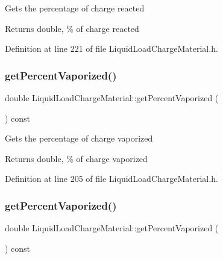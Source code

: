 Gets the percentage of charge reacted \begin{DoxyReturn}{Returns}
double, \% of charge reacted 
\end{DoxyReturn}


Definition at line 221 of file Liquid\+Load\+Charge\+Material.\+h.

\mbox{\label{class_liquid_load_charge_material_a8e55b0df0a0551671636bcf169228dca}} 
\subsubsection{\texorpdfstring{get\+Percent\+Vaporized()}{getPercentVaporized()}\hspace{0.1cm}{\footnotesize\ttfamily [1/3]}}
{\footnotesize\ttfamily double Liquid\+Load\+Charge\+Material\+::get\+Percent\+Vaporized (\begin{DoxyParamCaption}{ }\end{DoxyParamCaption}) const\hspace{0.3cm}{\ttfamily [inline]}}

Gets the percentage of charge vaporized \begin{DoxyReturn}{Returns}
double, \% of charge vaporized 
\end{DoxyReturn}


Definition at line 205 of file Liquid\+Load\+Charge\+Material.\+h.

\mbox{\label{class_liquid_load_charge_material_a8e55b0df0a0551671636bcf169228dca}} 
\subsubsection{\texorpdfstring{get\+Percent\+Vaporized()}{getPercentVaporized()}\hspace{0.1cm}{\footnotesize\ttfamily [2/3]}}
{\footnotesize\ttfamily double Liquid\+Load\+Charge\+Material\+::get\+Percent\+Vaporized (\begin{DoxyParamCaption}{ }\end{DoxyParamCaption}) const\hspace{0.3cm}{\ttfamily [inline]}}

